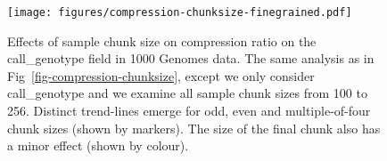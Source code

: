 \documentclass[a4paper,num-refs]{oup-contemporary}
\begin{document}
\begin{figure}[h]
\texttt{[image: figures/compression-chunksize-finegrained.pdf]}
\caption{Effects of sample chunk size on compression ratio on the call\_genotype
field in 1000 Genomes data.
The same analysis as in Fig~\ref{fig-compression-chunksize}, except we only
consider call\_genotype and we examine all sample chunk sizes from
100 to 256. Distinct trend-lines emerge for odd, even and multiple-of-four
chunk sizes (shown by markers). The size of the final chunk also has a minor
effect (shown by colour).
\label{fig-compression-chunksize-finegrained}}
\end{figure}
\end{document}
